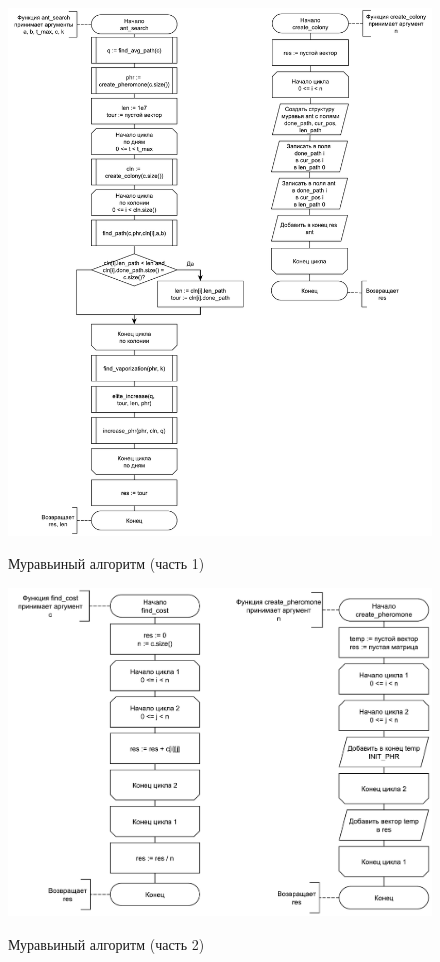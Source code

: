 \begin{figure}[h]
	\begin{center}
		{\includegraphics[scale = 0.6]{schemes/ant1}}
		\caption{Муравьиный алгоритм (часть 1)}
		\label{fig3:image}
	\end{center}
\end{figure}

\begin{figure}[h]
	\begin{center}
		{\includegraphics[scale = 0.6]{schemes/ant2}}
		\caption{Муравьиный алгоритм (часть 2)}
		\label{fig4:image}
	\end{center}
\end{figure}

